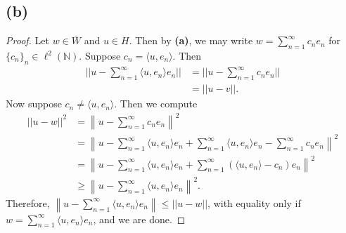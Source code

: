 \documentclass{article}
\newcommand{\N}{\mathbb{N}} %
\begin{document}
\subsection*{(b)}
\begin{proof}
	Let $w \in \overline{W}$ and $u \in H$. Then by \textbf{(a)}, we may write $w = \sum_{n=1}^{\infty} c_n e_n$ for $\{c_n\}_n \in \ell^2(\N)$. Suppose $c_n = \langle u, e_n \rangle$. Then
	\begin{align}
		||u - \sum_{n=1}^{\infty} \langle u, e_n \rangle e_n|| &= ||u - \sum_{n=1}^{\infty} c_n e_n || \\
		&= ||u - v||.
	\end{align}
	Now suppose $c_n \neq \langle u, e_n \rangle$. Then we compute
	\begin{align}
		||u - w||^2 &= \left\|u - \sum_{n=1}^{\infty} c_n e_n \right\|^2 \\
		&= \left\|u - \sum_{n=1}^{\infty} \langle u, e_n \rangle e_n + \sum_{n=1}^{\infty} \langle u, e_n \rangle e_n - \sum_{n=1}^{\infty}c_n e_n\right\|^2 \\
		&= \left\|u - \sum_{n=1}^{\infty} \langle u, e_n \rangle e_n + \sum_{n=1}^{\infty}(\langle u, e_n \rangle - c_n)e_n\right\|^2 \\
		& \geq \left\|u - \sum_{n=1}^{\infty} \langle u, e_n \rangle e_n \right\|^2.
	\end{align}
	Therefore, $\left\|u - \sum_{n=1}^{\infty} \langle u, e_n \rangle e_n\right\| \leq ||u - w||$, with equality only if \\$w = \sum_{n=1}^{\infty} \langle u, e_n \rangle e_n$, and we are done.
\end{proof}
\end{document}
